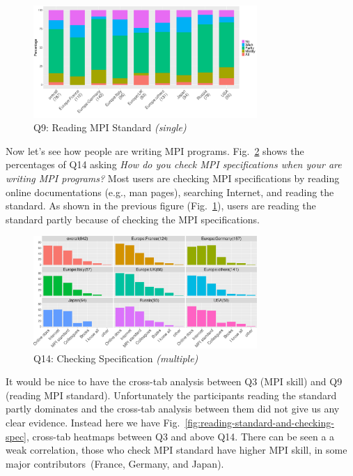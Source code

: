 \documentclass[preprint,5p,times]{elsarticle}
\def\myquote#1{{\it #1}}
\def\mcountries{major contributors\xspace{}}%
\begin{document}
\begin{figure}[htb]
\begin{center}
\includegraphics[width=8.5cm]{R-scripts/Q9.pdf}
\caption{Q9: Reading MPI Standard {\it(single)}}
\label{fig:reading-standard}
\end{center}
\end{figure}

Now let's see how people are writing MPI
programs. Fig.~\ref{fig:checking-spec} shows the percentages of Q14
asking \myquote{How do you check MPI specifications when your are writing MPI
programs?} Most users are checking MPI specifications by reading online
documentations (e.g., man pages), searching Internet, and reading the
standard. As shown in the previous figure
(Fig.~\ref{fig:reading-standard}), users are reading the standard
partly because of checking the MPI specifications.

\begin{figure}[htb]
\begin{center}
\includegraphics[width=8.5cm]{R-scripts/Q14.pdf}
\caption{Q14: Checking Specification {\it(multiple)}}
\label{fig:checking-spec}
\end{center}
\end{figure}

It would be nice to have the cross-tab analysis between Q3 (MPI skill)
and Q9 (reading MPI standard). Unfortunately the participants reading
the standard partly dominates and the cross-tab analysis
between them did not give us any clear evidence.  Instead here we have
Fig.~\ref{fig:reading-standard-and-checking-spec}, cross-tab
heatmaps between Q3 and above Q14. There can be seen a a weak
correlation, those who check MPI standard have higher MPI skill,
in some \mcountries\  (France, Germany, and Japan).
\end{document}
